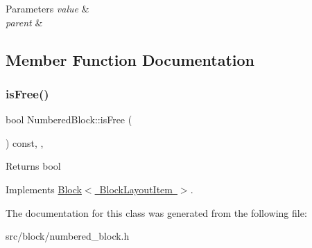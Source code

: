 \begin{DoxyParams}{Parameters}
{\em value} & \\
\hline
{\em parent} & \\
\hline
\end{DoxyParams}


\subsection{Member Function Documentation}
\mbox{\label{class_numbered_block_a04899b0e9d90f4ce4faa8aae9e4140e9}} 
\subsubsection{\texorpdfstring{isFree()}{isFree()}}
{\footnotesize\ttfamily bool Numbered\+Block\+::is\+Free (\begin{DoxyParamCaption}{ }\end{DoxyParamCaption}) const\hspace{0.3cm}{\ttfamily [inline]}, {\ttfamily [override]}, {\ttfamily [virtual]}}

\begin{DoxyReturn}{Returns}
bool 
\end{DoxyReturn}


Implements \mbox{\hyperlink{class_block_a795e0536746b840286cb1e74487311a9}{Block$<$ Block\+Layout\+Item $>$}}.



The documentation for this class was generated from the following file\+:\begin{DoxyCompactItemize}
\item 
src/block/numbered\+\_\+block.\+h\end{DoxyCompactItemize}
